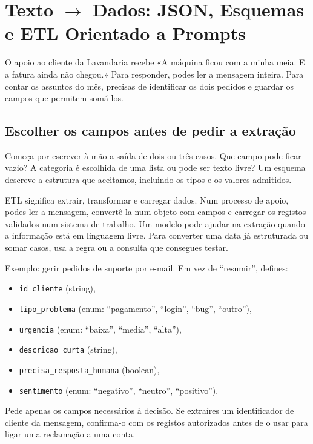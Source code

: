 \chapter{Texto \texorpdfstring{$\to$}{->} Dados: JSON, Esquemas e ETL Orientado a Prompts}
\label{ch:texto-dados}

\ficcao O apoio ao cliente da Lavandaria recebe «A máquina ficou com a minha meia. E a fatura ainda não chegou.» Para responder, podes ler a mensagem inteira. Para contar os assuntos do mês, precisas de identificar os dois pedidos e guardar os campos que permitem somá-los.

\section{Escolher os campos antes de pedir a extração}
Começa por escrever à mão a saída de dois ou três casos. Que campo pode ficar vazio? A categoria é escolhida de uma lista ou pode ser texto livre? Um esquema descreve a estrutura que aceitamos, incluindo os tipos e os valores admitidos.

ETL significa extrair, transformar e carregar dados. Num processo de apoio, podes ler a mensagem, convertê-la num objeto com campos e carregar os registos validados num sistema de trabalho. Um modelo pode ajudar na extração quando a informação está em linguagem livre. Para converter uma data já estruturada ou somar casos, usa a regra ou a consulta que consegues testar.

Exemplo: gerir pedidos de suporte por e-mail. Em vez de “resumir”, defines:

\begin{itemize}[leftmargin=*]
\item \texttt{id\_cliente} (string),
\item \texttt{tipo\_problema} (enum: “pagamento”, “login”, “bug”, “outro”),
\item \texttt{urgencia} (enum: “baixa”, “media”, “alta”),
\item \texttt{descricao\_curta} (string),
\item \texttt{precisa\_resposta\_humana} (boolean),
\item \texttt{sentimento} (enum: “negativo”, “neutro”, “positivo”).
\end{itemize}

Pede apenas os campos necessários à decisão. Se extraíres um identificador de cliente da mensagem, confirma-o com os registos autorizados antes de o usar para ligar uma reclamação a uma conta.

